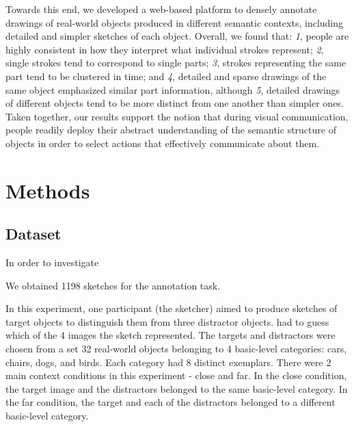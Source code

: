 \documentclass[10pt,letterpaper]{article}
\begin{document}
Towards this end, we developed a web-based platform to densely annotate drawings of real-world objects produced in different semantic contexts, including detailed and simpler sketches of each object. 
Overall, we found that: \textit{1}, people are highly consistent in how they interpret what individual strokes represent; \textit{2}, single strokes tend to correspond to single parts; \textit{3}, strokes representing the same part tend to be clustered in time; and \textit{4}, detailed and sparse drawings of the same object emphasized similar part information, although \textit{5}, detailed drawings of different objects tend to be more distinct from one another than simpler ones. 
Taken together, our results support the notion that during visual communication, people readily deploy their abstract understanding of the semantic structure of objects in order to select actions that effectively communicate about them. 

\section{Methods}

\subsection{Dataset}


In order to investigate  

We obtained 1198 sketches for the annotation task. 


In this experiment, one participant (the sketcher) aimed to produce sketches of target objects to distinguish them from three distractor objects. 
 had to guess which of the 4 images the sketch represented. 
The targets and distractors were chosen from a set 32 real-world objects belonging to 4 basic-level categories: cars, chairs, dogs, and birds. 
Each category had 8 distinct exemplars. 
There were 2 main context conditions in this experiment - close and far. 
In the close condition, the target image and the distractors belonged to the same basic-level category. 
In the far condition, the target and each of the distractors belonged to a different basic-level category.
\end{document}
